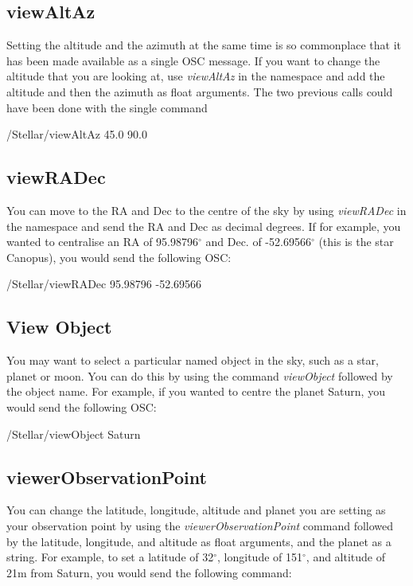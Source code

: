 \subsection{viewAltAz}
Setting the altitude and the azimuth at the same time is so commonplace that it has been made available as a single OSC message.
If you want to change the altitude that you are looking at, use \textit{viewAltAz} in the namespace and add the altitude and then the azimuth as float arguments. The two previous calls could have been done with the single command
\begin{syntax}	
	\medskip
	/Stellar/viewAltAz 45.0 90.0
	\medskip
\end{syntax}

\subsection{viewRADec}
You can move to the RA and Dec to the centre of the sky by using  \textit{viewRADec} in the namespace and send the RA and Dec as decimal degrees. If for example, you wanted to centralise  an RA of 95.98796$^{\circ}$  and Dec. of -52.69566$^{\circ}$  (this is the star Canopus), you would send the following OSC:
 \begin{syntax}	
 	\medskip
 	/Stellar/viewRADec 95.98796 -52.69566
 	\medskip
 \end{syntax}
 
 \subsection{View Object}
 You may want to select a particular named object in the sky, such as a star, planet or moon. You can do this by using the command \textit{viewObject} followed by the object name. For example, if you wanted to centre the planet Saturn, you would send the following OSC:
 
\begin{syntax}	
 	\medskip
 	 /Stellar/viewObject Saturn
 	\medskip
 \end{syntax}
 
 \subsection{viewerObservationPoint}
 You can change the latitude, longitude, altitude and planet you are setting as your observation point by using the \textit{viewerObservationPoint} command followed by the latitude, longitude, and altitude as float arguments, and the planet as a string.  For example, to set a latitude of 32$^{\circ}$, longitude of 151$^{\circ}$, and altitude of 21m from Saturn, you would send the following command:
 
